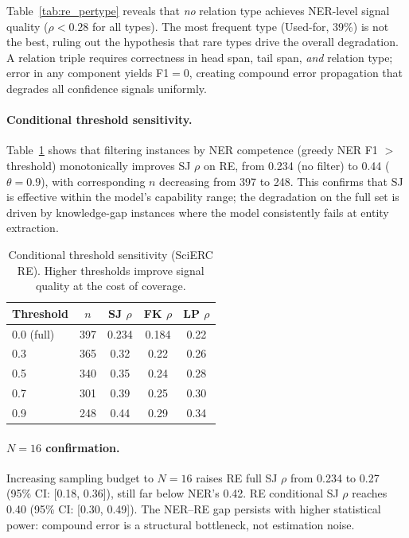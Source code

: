 \documentclass[11pt,a4paper]{article}
\begin{document}
Table~\ref{tab:re_pertype} reveals that \emph{no} relation type achieves NER-level signal quality ($\rho < 0.28$ for all types). The most frequent type (Used-for, 39\%) is not the best, ruling out the hypothesis that rare types drive the overall degradation. A relation triple requires correctness in head span, tail span, \emph{and} relation type; error in any component yields F1$=$0, creating compound error propagation that degrades all confidence signals uniformly.

\paragraph{Conditional threshold sensitivity.}
Table~\ref{tab:threshold} shows that filtering instances by NER competence (greedy NER F1 $>$ threshold) monotonically improves SJ $\rho$ on RE, from 0.234 (no filter) to 0.44 ($\theta{=}0.9$), with corresponding $n$ decreasing from 397 to 248. This confirms that SJ is effective within the model's capability range; the degradation on the full set is driven by knowledge-gap instances where the model consistently fails at entity extraction.

\begin{table}[t]
\centering
\small
\caption{Conditional threshold sensitivity (SciERC RE). Higher thresholds improve signal quality at the cost of coverage.}
\label{tab:threshold}
\begin{tabular}{lcccc}
\toprule
\textbf{Threshold} & $n$ & \textbf{SJ $\rho$} & \textbf{FK $\rho$} & \textbf{LP $\rho$} \\
\midrule
0.0 (full) & 397 & 0.234 & 0.184 & 0.22 \\
0.3 & 365 & 0.32 & 0.22 & 0.26 \\
0.5 & 340 & 0.35 & 0.24 & 0.28 \\
0.7 & 301 & 0.39 & 0.25 & 0.30 \\
0.9 & 248 & 0.44 & 0.29 & 0.34 \\
\bottomrule
\end{tabular}
\end{table}

\paragraph{$N{=}16$ confirmation.}
Increasing sampling budget to $N{=}16$ raises RE full SJ $\rho$ from 0.234 to 0.27 (95\% CI: [0.18, 0.36]), still far below NER's 0.42. RE conditional SJ $\rho$ reaches 0.40 (95\% CI: [0.30, 0.49]). The NER--RE gap persists with higher statistical power: compound error is a structural bottleneck, not estimation noise.
\end{document}
